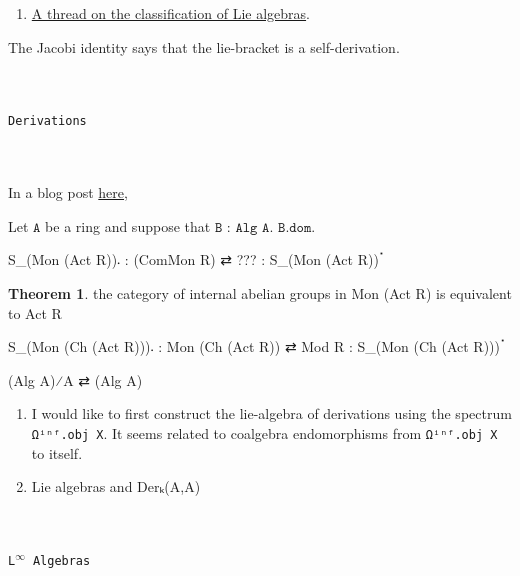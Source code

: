 \documentclass{book}
\theoremstyle{definition}
\newtheorem{theorem}{Theorem}
\renewcommand{\chapter}[1]{
\newpage
{
\Huge 
\begin{center}
\ \\
\ \\
\thispagestyle{empty}
\texttt{#1}
\end{center}}
\ \\
\ \\
}
\begin{document}
\begin{enumerate}
\item \href{https://leanprover.zulipchat.com/#narrow/stream/287929-mathlib4/topic/The.20classification.20of.20Lie.20algebras}{A thread on the classification of Lie algebras}.
\end{enumerate}

The Jacobi identity says that the lie-bracket is a self-derivation.\\




\newpage
\chapter{Derivations}

In a blog post \href{https://amathew.wordpress.com/2011/05/14/the-cotangent-complex-i-group-objects-in-categories-of-algebras/}{here},



Let $\texttt{A}$ be a ring and suppose that $\texttt{B : Alg A}$. $\texttt{B.dom}$.\\

\begin{center}
S\_(Mon (Act R))𛲔 : (ComMon R) ⇄ ??? : S\_(Mon (Act R))ॱ
\end{center}

\begin{theorem}the category of internal abelian groups in Mon (Act R) is equivalent to Act R
\end{theorem}

\begin{center}
S\_(Mon (Ch (Act R)))𛲔 : Mon (Ch (Act R)) ⇄ Mod R : S\_(Mon (Ch (Act R)))ॱ
\end{center}


\begin{center}
(Alg A)⁄A ⇄ (Alg A)
\end{center}


\begin{enumerate}
\item I would like to first construct the lie-algebra of derivations using the spectrum \texttt{Ωⁱⁿᶠ.obj X}. It seems related to coalgebra endomorphisms from \texttt{Ωⁱⁿᶠ.obj X} to itself.
\item Lie algebras and Derₖ(A,A)
\end{enumerate}


\newpage
\chapter{L${}^{\infty}$ Algebras}
\end{document}
